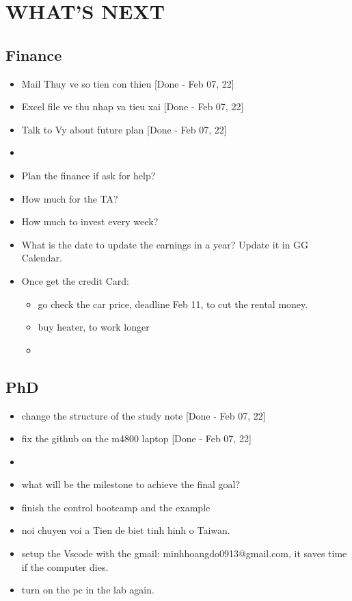\section{WHAT'S NEXT}

\subsection{Finance}
\begin{itemize}
    \item Mail Thuy ve so tien con thieu [Done - Feb 07, 22]
    \item Excel file ve thu nhap va tieu xai [Done - Feb 07, 22]
    \item Talk to Vy about future plan [Done - Feb 07, 22]
    \item 
    \item Plan the finance if ask for help?
    \item How much for the TA?
    \item How much to invest every week?
    \item What is the date to update the earnings in a year? Update it in GG Calendar.
    \item Once get the credit Card:
        \begin{itemize}
            \item go check the car price, deadline Feb 11, to cut the rental money.
            \item buy heater, to work longer
            \item 
        \end{itemize}
\end{itemize}

\subsection{PhD}
\begin{itemize}
    \item change the structure of the study note [Done - Feb 07, 22]
    \item fix the github on the m4800 laptop [Done - Feb 07, 22]
    \item 
    \item what will be the milestone to achieve the final goal?
    \item finish the control bootcamp and the example
    \item noi chuyen voi a Tien de biet tinh hinh o Taiwan.
    \item setup the Vscode with the gmail: minhhoangdo0913@gmail.com, it saves time if the computer dies.
    \item turn on the pc in the lab again.
\end{itemize}

